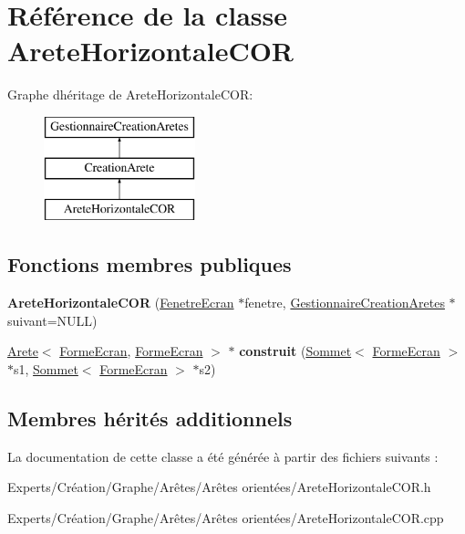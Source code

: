\hypertarget{class_arete_horizontale_c_o_r}{}\section{Référence de la classe Arete\+Horizontale\+C\+OR}
\label{class_arete_horizontale_c_o_r}
Graphe d\textquotesingle{}héritage de Arete\+Horizontale\+C\+OR\+:\begin{figure}[H]
\begin{center}
\leavevmode
\includegraphics[height=3.000000cm]{class_arete_horizontale_c_o_r}
\end{center}
\end{figure}
\subsection*{Fonctions membres publiques}
\begin{DoxyCompactItemize}
\item 
\mbox{\label{class_arete_horizontale_c_o_r_a7f365077cf36e56277d22c2f1bbe0de1}} 
{\bfseries Arete\+Horizontale\+C\+OR} (\mbox{\hyperlink{class_fenetre_ecran}{Fenetre\+Ecran}} $\ast$fenetre, \mbox{\hyperlink{class_gestionnaire_creation_aretes}{Gestionnaire\+Creation\+Aretes}} $\ast$suivant=N\+U\+LL)
\item 
\mbox{\label{class_arete_horizontale_c_o_r_a16c2756c16617b0645c65fb85d233dc5}} 
\mbox{\hyperlink{class_arete}{Arete}}$<$ \mbox{\hyperlink{class_forme_ecran}{Forme\+Ecran}}, \mbox{\hyperlink{class_forme_ecran}{Forme\+Ecran}} $>$ $\ast$ {\bfseries construit} (\mbox{\hyperlink{class_sommet}{Sommet}}$<$ \mbox{\hyperlink{class_forme_ecran}{Forme\+Ecran}} $>$ $\ast$s1, \mbox{\hyperlink{class_sommet}{Sommet}}$<$ \mbox{\hyperlink{class_forme_ecran}{Forme\+Ecran}} $>$ $\ast$s2)
\end{DoxyCompactItemize}
\subsection*{Membres hérités additionnels}


La documentation de cette classe a été générée à partir des fichiers suivants \+:\begin{DoxyCompactItemize}
\item 
Experts/\+Création/\+Graphe/\+Arêtes/\+Arêtes orientées/Arete\+Horizontale\+C\+O\+R.\+h\item 
Experts/\+Création/\+Graphe/\+Arêtes/\+Arêtes orientées/Arete\+Horizontale\+C\+O\+R.\+cpp\end{DoxyCompactItemize}
